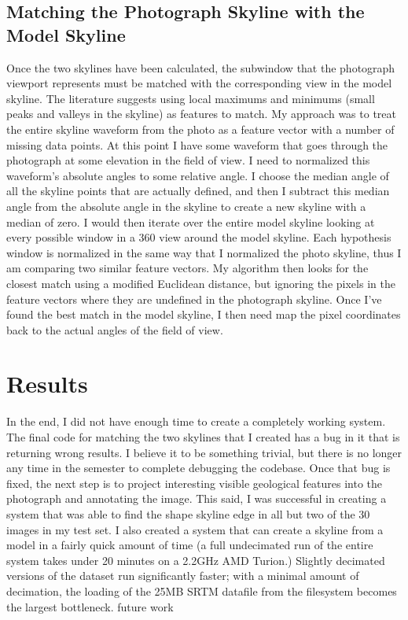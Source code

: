 \documentclass{acm_proc_article-sp}
\begin{document}
\subsection{Matching the Photograph Skyline with the Model Skyline}
    Once the two skylines have been calculated, the subwindow that the photograph viewport represents must be matched with the corresponding view in the model skyline.  The literature suggests using local maximums and minimums (small peaks and valleys in the skyline) as features to match. My approach was to treat the entire skyline  waveform from the photo as a feature vector with a number of missing data points. At this point I have some waveform that goes through the photograph at some elevation in the field of view.  I need to normalized this waveform’s absolute angles to some relative angle.  I choose the median angle of all the skyline points that are actually defined, and then I subtract this median angle from the absolute angle in the skyline to create a new skyline with a median of zero.  I would then iterate over the entire model skyline looking at every possible window in a 360 view around the model skyline.  Each hypothesis window is normalized in the same way that I normalized the photo skyline, thus I am comparing two similar feature vectors.  My algorithm then looks for the closest match using a modified Euclidean distance, but ignoring the pixels in the feature vectors where they are undefined in the photograph skyline.  Once I’ve found the best match in the model skyline, I then need map the pixel coordinates back to the actual angles of the field of view.
\section{Results}
    In the end, I did not have enough time to create a completely working system.  The final code for matching the two skylines that I created has a bug in it that is returning wrong results.  I believe it to be something trivial, but there is no longer any time in the semester to complete debugging the codebase.  Once that bug is fixed, the next step is to project interesting visible geological features into the photograph and annotating the image.
    This said, I was successful in creating a system that was able to find the shape skyline edge in all but two of the 30 images in my test set.  I also created a system that can create a skyline from a model in a fairly quick amount of time (a full undecimated run of the entire system takes under 20 minutes on a 2.2GHz AMD Turion.)  Slightly decimated versions of the dataset run significantly faster; with a minimal amount of decimation, the loading of the 25MB SRTM datafile from the filesystem becomes the largest bottleneck.  
future work
\end{document}
